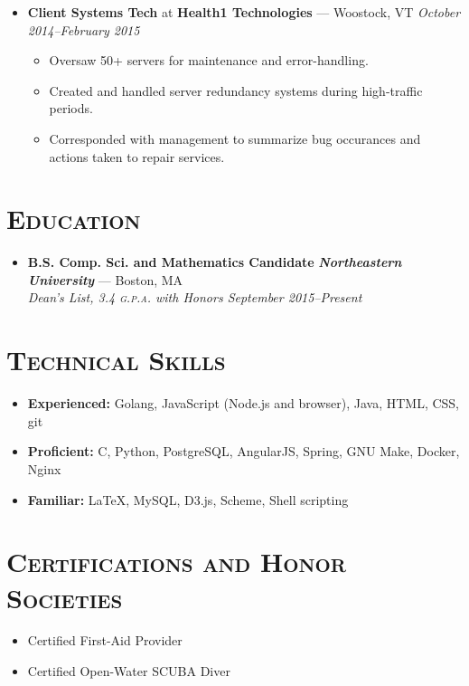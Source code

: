 \documentclass[11pt]{article}
\begin{document}
\begin{itemize}
\item \textbf{Client Systems Tech} at \textbf{Health1 Technologies} --- Woostock, VT \hfill {\em October 2014--February 2015}
  \begin{itemize}
  \item Oversaw 50+ servers for maintenance and error-handling.
  \item Created and handled server redundancy systems during high-traffic periods.
  \item Corresponded with management to summarize bug occurances and actions taken to repair services.
  \end{itemize}
\end{itemize}


\section*{\textsc{Education}}
\begin{itemize}
\item \textbf{B.S. Comp. Sci. and Mathematics Candidate} \hfill \textit{\textbf{Northeastern University}} --- Boston, MA \\ \em{Dean's List}, 3.4 \textsc{g.p.a.} with Honors \hfill {\em September 2015--Present}
\end{itemize}



\section*{\textsc{Technical Skills}}
\begin{itemize}
\item \textbf{Experienced:} Golang, JavaScript (Node.js and browser), Java, HTML, CSS, git
\item \textbf{Proficient:} C, Python, PostgreSQL, AngularJS, Spring, GNU Make, Docker, Nginx
\item \textbf{Familiar:} LaTeX, MySQL, D3.js, Scheme, Shell scripting
\end{itemize}



\section*{\textsc{Certifications and Honor Societies}}
\begin{itemize}
\item Certified First-Aid Provider
\item Certified Open-Water SCUBA Diver
\end{itemize}
\end{document}
